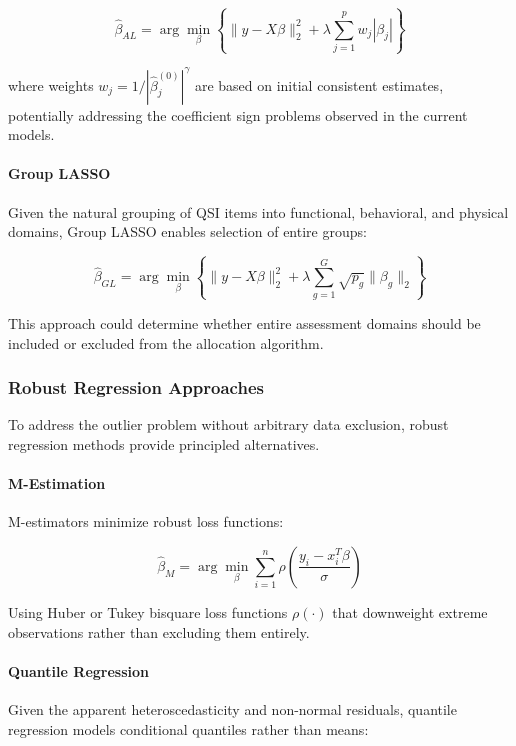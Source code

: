 \documentclass[12pt]{article}
\begin{document}
\begin{equation}
\hat{\beta}_{AL} = \arg\min_{\beta} \left\{ \|y - X\beta\|_2^2 + \lambda\sum_{j=1}^p w_j|\beta_j| \right\}
\end{equation}

where weights $w_j = 1/|\hat{\beta}_j^{(0)}|^\gamma$ are based on initial consistent estimates, potentially addressing the coefficient sign problems observed in the current models.

\paragraph{Group LASSO}
Given the natural grouping of QSI items into functional, behavioral, and physical domains, Group LASSO enables selection of entire groups:

\begin{equation}
\hat{\beta}_{GL} = \arg\min_{\beta} \left\{ \|y - X\beta\|_2^2 + \lambda\sum_{g=1}^G \sqrt{p_g}\|\beta_g\|_2 \right\}
\end{equation}

This approach could determine whether entire assessment domains should be included or excluded from the allocation algorithm.

\subsubsection{Robust Regression Approaches}

To address the outlier problem without arbitrary data exclusion, robust regression methods provide principled alternatives.

\paragraph{M-Estimation}
M-estimators minimize robust loss functions:

\begin{equation}
\hat{\beta}_{M} = \arg\min_{\beta} \sum_{i=1}^n \rho\left(\frac{y_i - x_i^T\beta}{\sigma}\right)
\end{equation}

Using Huber or Tukey bisquare loss functions $\rho(\cdot)$ that downweight extreme observations rather than excluding them entirely.

\paragraph{Quantile Regression}
Given the apparent heteroscedasticity and non-normal residuals, quantile regression models conditional quantiles rather than means:
\end{document}
